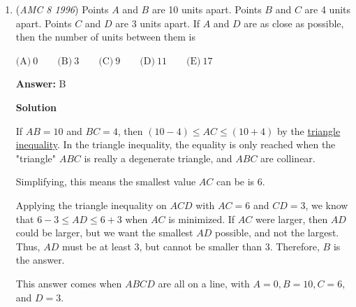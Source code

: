 \begin{enumerate}
 You could create a similar table without doing all of the calculations by converting all the goldfish into powers of $2$.  In this table, you could increase Brent's goldfish by two powers of $2$, while increasing Gretel's fish by one power of $2$.

 Either way, in $5$ months they will have the same number of fish, giving an answer of $\boxed{B}$




\textbf{Solution 2}

Create two equations.

 Brent starts with $4$ goldfish and they quadruple each month, giving us $y=4\cdot 4^{x}$ or $y=2^{2x+2}$.

 Gretel starts with $128$ goldfish and they double each month, giving us $y=128 \cdot 2^{x}$ or $y=2^{x+7}$.

 Using substitution, $2^{2x+2}=2^{x+7}$. Thus $2x+2=x+7$ giving us $x=5$, which is $\boxed{B}$.

 


	\item (\textit{AMC 8 1996}) Points $A$ and $B$ are 10 units apart.  Points $B$ and $C$ are 4 units apart.  Points $C$ and $D$ are 3 units apart.  If $A$ and $D$ are as close as possible, then the number of units between them is


 $\text{(A)}\ 0 \qquad \text{(B)}\ 3 \qquad \text{(C)}\ 9 \qquad \text{(D)}\ 11 \qquad \text{(E)}\ 17$

 \textbf{Answer: }B



\textbf{Solution}

If $AB = 10$ and $BC=4$, then $(10 - 4) \le AC \le (10 + 4)$ by the \href{https://artofproblemsolving.com/wiki/index.php?title=Triangle\_inequality}{triangle inequality}.  In the triangle inequality, the equality is only reached when the "triangle" $ABC$ is really a degenerate triangle, and $ABC$ are collinear.  

 Simplifying, this means the smallest value $AC$ can be is $6$.  

 Applying the triangle inequality on $ACD$ with $AC = 6$ and $CD = 3$, we know that $6 - 3 \le AD \le 6 + 3$ when $AC$ is minimized.  If $AC$ were larger, then $AD$ could be larger, but we want the smallest $AD$ possible, and not the largest.  Thus, $AD$ must be at least $3$, but cannot be smaller than $3$.  Therefore, $\boxed{B}$ is the answer.

 This answer comes when $ABCD$ are all on a line, with $A=0, B=10, C = 6,$ and $D=3$.


\end{enumerate}

